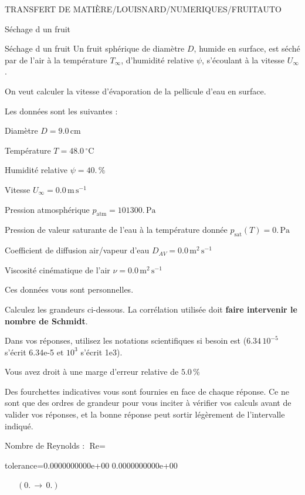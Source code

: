 \documentclass[12pt]{article}
\begin{document}
\begin{quiz}{TRANSFERT DE MATIÈRE/LOUISNARD/NUMERIQUES/FRUITAUTO}
\begin{cloze}{Séchage d un fruit}
\end{cloze} 


 \begin{cloze}{Séchage d un fruit} 
Un fruit sphérique de diamètre $D$, humide en surface, est séché par de l'air à la température $T_\infty$, d'humidité relative $\psi$, s'écoulant à la vitesse $U_\infty$.

On veut calculer la vitesse d'évaporation de la pellicule d'eau en surface.

 

Les données sont les suivantes :

 

Diamètre $D = 9.0\,  \mathrm{cm} $

Température $T = 48.0\,  \mathrm{^\circ\mathrm{C}} $

Humidité relative $\psi = 40.\, \% $

Vitesse $U_\infty = 0.0\,  \mathrm{m}\,  \mathrm{s}^{-1} $

Pression atmosphérique $p_{\text{atm}} = 101300.\,  \mathrm{Pa} $

Pression de valeur saturante de l’eau à la température donnée $p_{\text{sat}}(T) = 0.\,  \mathrm{Pa} $

Coefficient de diffusion air/vapeur d’eau $D_{AV} = 0.0\,  \mathrm{m}^{2}\,  \mathrm{s}^{-1} $

Viscosité cinématique de l’air $\nu = 0.0\,  \mathrm{m}^{2}\,  \mathrm{s}^{-1} $

Ces données vous sont personnelles.

 

Calculez les grandeurs ci-dessous. La corrélation utilisée doit \textbf{faire intervenir le nombre de Schmidt}.

Dans vos réponses, utilisez les notations scientifiques si besoin est ($6.34\, 10^{-5}$ s'écrit 6.34e-5 et $10^{3}$ s'écrit 1e3).

Vous avez droit à une marge d'erreur relative de $5.0\, \% $

Des fourchettes indicatives vous sont fournies en face de chaque réponse. Ce ne sont que des ordres de grandeur pour vous inciter à vérifier vos calculs avant de valider vos réponses, et la bonne réponse peut sortir légèrement de l'intervalle indiqué.

 

Nombre de Reynolds : $\text{Re} =  $
\begin{numerical}[points=1] 
\item[tolerance={0.0000000000e+00}] 0.0000000000e+00 
\end{numerical} 
 $\,$ 
 $ \quad (0. \, \rightarrow \, 0.) $ 


\end{cloze}
\end{quiz}
\end{document}
